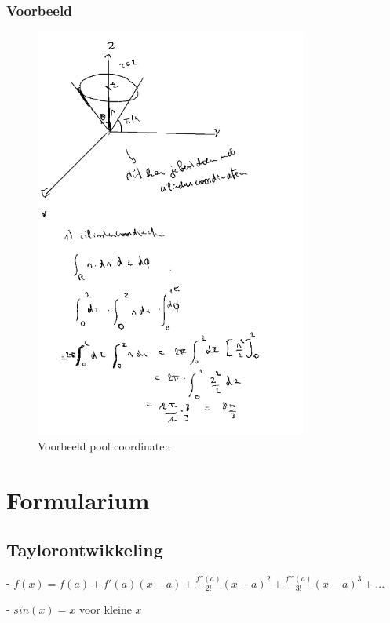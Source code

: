 \documentclass[a4paper]{article}
\begin{document}
\subsubsection{Voorbeeld}


\begin{figure}[H]
	\centering
	\includegraphics[width=0.8\textwidth]{assets/voorbeeld_pool_coordinaten.png}
	\caption{Voorbeeld pool coordinaten}
	\label{fig:voorbeeld_pool_coordinaten}
\end{figure}

\section*{Formularium}

\subsection*{Taylorontwikkeling}

- $ f(x) = f(a) + f'(a)(x-a) + \frac{f''(a)}{2!}(x-a)^2 + \frac{f'''(a)}{3!}(x-a)^3 + ... $

- $sin(x) = x$ voor kleine $x$
\end{document}
